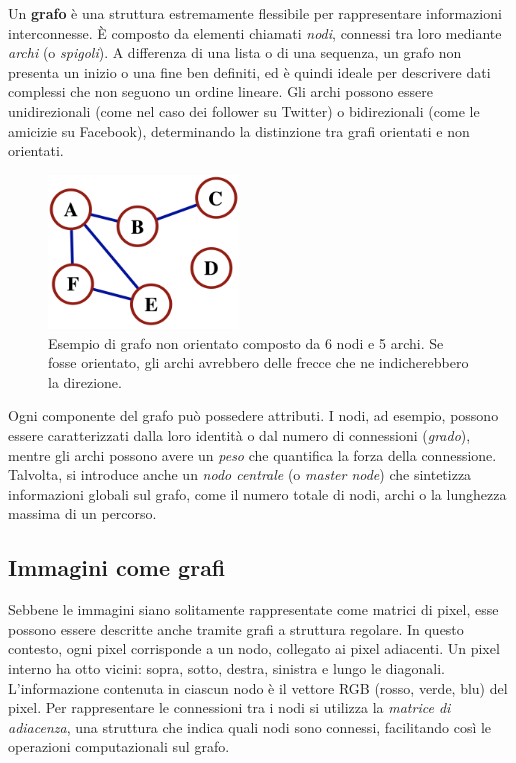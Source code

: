 Un \textbf{grafo} è una struttura estremamente flessibile per rappresentare informazioni interconnesse. È composto da elementi chiamati \textit{nodi}, connessi tra loro mediante \textit{archi} (o \textit{spigoli}). A differenza di una lista o di una sequenza, un grafo non presenta un inizio o una fine ben definiti, ed è quindi ideale per descrivere dati complessi che non seguono un ordine lineare. Gli archi possono essere unidirezionali (come nel caso dei follower su Twitter) o bidirezionali (come le amicizie su Facebook), determinando la distinzione tra grafi orientati e non orientati.
\begin{figure}
    \centering
    \includegraphics[width=0.45\textwidth]{figure/Graph.png}
    \caption{Esempio di grafo non orientato composto da 6 nodi e 5 archi. Se fosse orientato, gli archi avrebbero delle frecce che ne indicherebbero la direzione.}
    \label{fig:enter-label}
\end{figure}
Ogni componente del grafo può possedere attributi. I nodi, ad esempio, possono essere caratterizzati dalla loro identità o dal numero di connessioni (\textit{grado}), mentre gli archi possono avere un \textit{peso} che quantifica la forza della connessione. Talvolta, si introduce anche un \textit{nodo centrale} (o \textit{master node}) che sintetizza informazioni globali sul grafo, come il numero totale di nodi, archi o la lunghezza massima di un percorso.

\subsection{Immagini come grafi}

Sebbene le immagini siano solitamente rappresentate come matrici di pixel, esse possono essere descritte anche tramite grafi a struttura regolare. In questo contesto, ogni pixel corrisponde a un nodo, collegato ai pixel adiacenti. Un pixel interno ha otto vicini: sopra, sotto, destra, sinistra e lungo le diagonali. L'informazione contenuta in ciascun nodo è il vettore RGB (rosso, verde, blu) del pixel. Per rappresentare le connessioni tra i nodi si utilizza la \textit{matrice di adiacenza}, una struttura che indica quali nodi sono connessi, facilitando così le operazioni computazionali sul grafo.

